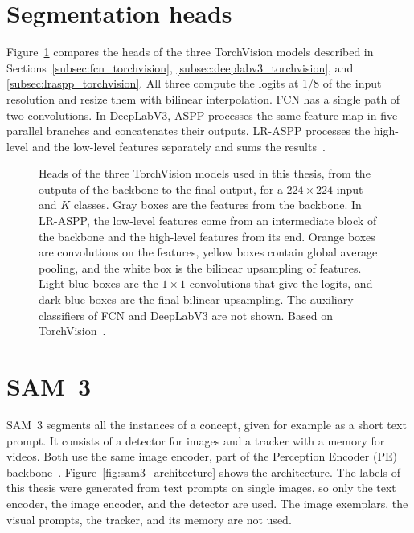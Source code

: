 \section{Segmentation heads}
\label{sec:segmentation_heads}

Figure~\ref{fig:heads} compares the heads of the three TorchVision models described in Sections~\ref{subsec:fcn_torchvision}, \ref{subsec:deeplabv3_torchvision}, and \ref{subsec:lraspp_torchvision}. All three compute the logits at 1/8 of the input resolution and resize them with bilinear interpolation. FCN has a single path of two convolutions. In DeepLabV3, ASPP processes the same feature map in five parallel branches and concatenates their outputs. LR-ASPP processes the high-level and the low-level features separately and sums the results~\cite{torchvision_fcn,torchvision_deeplabv3,torchvision_lraspp,torchvision_seg_utils}.

\begin{figure}[H]
  \centering
  \resizebox{\linewidth}{!}{}%
  \caption{Heads of the three TorchVision models used in this thesis, from the outputs of the backbone to the final output, for a $224\times224$ input and $K$ classes. Gray boxes are the features from the backbone. In LR-ASPP, the low-level features come from an intermediate block of the backbone and the high-level features from its end. Orange boxes are convolutions on the features, yellow boxes contain global average pooling, and the white box is the bilinear upsampling of features. Light blue boxes are the $1\times1$ convolutions that give the logits, and dark blue boxes are the final bilinear upsampling. The auxiliary classifiers of FCN and DeepLabV3 are not shown. Based on TorchVision~\cite{torchvision_fcn,torchvision_deeplabv3,torchvision_lraspp}.}
  \label{fig:heads}
\end{figure}

\section{SAM~3}
\label{sec:sam3_theory}

SAM~3 segments all the instances of a concept, given for example as a short text prompt. It consists of a detector for images and a tracker with a memory for videos. Both use the same image encoder, part of the Perception Encoder (PE) backbone~\cite{carion2026sam3}. Figure~\ref{fig:sam3_architecture} shows the architecture. The labels of this thesis were generated from text prompts on single images, so only the text encoder, the image encoder, and the detector are used. The image exemplars, the visual prompts, the tracker, and its memory are not used.

